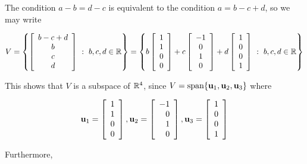 \begin{solution}
The condition $a-b=d-c$ is equivalent to the condition
$a=b-c+d$, so we may write

\[ V =\left\{
\left[\begin{array}{c} b-c+d\\ b\\ c\\ d\end{array}\right] ~:~b,c,d  \in\mathbb{R}
\right\}
= \left\{
b\left[\begin{array}{c} 1\\ 1\\ 0\\ 0\end{array}\right]
+c\left[\begin{array}{c} -1\\ 0\\ 1\\ 0\end{array}\right]
+d\left[\begin{array}{c} 1\\ 0\\ 0\\ 1\end{array}\right]
~:~ b,c,d\in\mathbb{R} \right\}
\]

This shows that $V$ is a subspace of $\mathbb{R}^4$,
since $V=\mbox{span}\{ {\bf u}_1, {\bf u}_2, {\bf u}_3 \}$ where

\begin{equation*}
{\bf u}_1  =  \left[\begin{array}{r} 
1 \\
1 \\
0 \\
0 \end{array}\right], {\bf u}_2  =  \left[\begin{array}{r} 
-1 \\
 0 \\
 1 \\
 0 \end{array}\right], {\bf u}_3  =  \left[\begin{array}{r} 
1 \\
 0 \\
 0 \\
 1 \end{array}\right]
\end{equation*}

Furthermore,


\end{solution}
